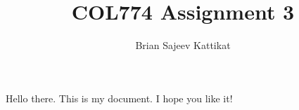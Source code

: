 \documentclass[12pt, letterpaper]{article}
\title{COL774 Assignment 3}
\author{Brian Sajeev Kattikat}
\begin{document}
\maketitle
Hello there. This is my document. I hope you like it!
\end{document}

